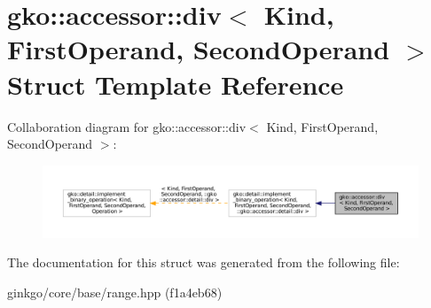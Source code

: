 \hypertarget{structgko_1_1accessor_1_1div}{}\section{gko\+:\+:accessor\+:\+:div$<$ Kind, First\+Operand, Second\+Operand $>$ Struct Template Reference}
\label{structgko_1_1accessor_1_1div}


Collaboration diagram for gko\+:\+:accessor\+:\+:div$<$ Kind, First\+Operand, Second\+Operand $>$\+:
\nopagebreak
\begin{figure}[H]
\begin{center}
\leavevmode
\includegraphics[width=350pt]{structgko_1_1accessor_1_1div__coll__graph}
\end{center}
\end{figure}


The documentation for this struct was generated from the following file\+:\begin{DoxyCompactItemize}
\item 
ginkgo/core/base/range.\+hpp (f1a4eb68)\end{DoxyCompactItemize}
